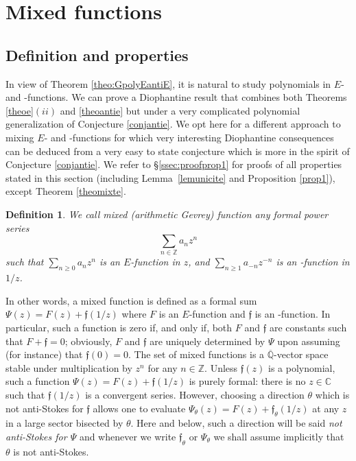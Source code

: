 \documentclass[reqno,12pt]{article}
\numberwithin{equation}{section}
\newtheorem{defi}{Definition}
\theoremstyle{remark}
\newcommand{\Z}{\mathbb{Z}}
\providecommand{\C}{}\renewcommand{\C}{\mathbb{C}}
\newcommand{\Qbar}{\overline{\mathbb Q}}
\newcommand{\tantie}{{\fontencoding{OT2}\fontfamily{wncyr}\selectfont\CYREREV}}
\newcommand{\antie}{\text{\tantie}}
\newcommand{\fgo}{\mathfrak{f}}
\begin{document}
\section{Mixed  functions}\label{ssec:mixedfunctions}


\subsection{Definition and properties}

In view of Theorem \ref{theo:GpolyEantiE}, it is natural to study polynomials in $E$- and \tantie-functions. We can prove a Diophantine result that combines both Theorems \ref{theoe}$(ii)$ and \ref{theoantie} but under a very complicated polynomial  generalization of Conjecture \ref{conjantie}. We opt here for a different approach to mixing $E$- and \tantie-functions for which very interesting Diophantine consequences can be deduced from a very easy to state conjecture which is more in the spirit of Conjecture \ref{conjantie}. We refer to \S \ref{ssec:proofprop1} for proofs of all properties stated in this section (including Lemma~\ref{lemunicite} and Proposition \ref{prop1}), except Theorem \ref{theomixte}.

\begin{defi} \label{def:mixedfn}
We call {\em mixed (arithmetic Gevrey) function} any formal power series
$$\sum_{n\in\Z} a_n z^n$$
such that $\sum_{n\geq 0} a_n z^n$ is an $E$-function in $z$, and $\sum_{n\geq 1} a_{-n} z^{-n}$ is an \antie-function in $1/z$. 
\end{defi}
In other words, a mixed function is defined as a formal sum $\Psi(z)=F(z)+ \fgo (1/z)$ where $F$ is an $E$-function and $\fgo$ is an \antie-function. In particular, such a function is zero if, and only if, both $F$ and $\fgo$ are constants such that $F+\fgo=0$; obviously, $F$ and $\fgo$ are uniquely determined by $\Psi$ upon assuming (for instance) that $\fgo(0)=0$. The set of mixed functions is a $\Qbar$-vector space stable under multiplication by $z^n $ for any $n\in \Z$.  Unless $\fgo(z)$ is a polynomial, such a function $\Psi(z)=F(z)+ \fgo (1/z)$ is purely formal: there is no $z\in\C$ such that $\fgo(1/z)$ is a convergent series. However, choosing a  direction $\theta$  which is not anti-Stokes for   $\fgo$ allows one to evaluate $\Psi_\theta(z) = F(z)+  \fgo_{\theta} (1/z)$ at any $z$ in a large sector bisected by $\theta$. Here and below, 
such a direction will be said {\em not anti-Stokes for $\Psi$} and 
whenever we write $\fgo_{\theta}$ or $\Psi_\theta$ we shall assume implicitly that $\theta$ is not    anti-Stokes. 
\end{document}
